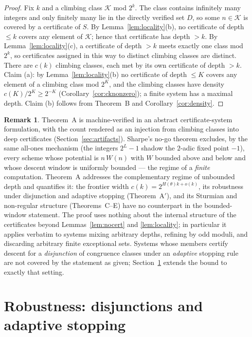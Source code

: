 \documentclass[11pt]{article}
\theoremstyle{definition}
\newtheorem{remark}[theorem]{Remark}
\begin{document}
\begin{proof}
Fix $k$ and a climbing class $\mathcal{K}$ mod $2^k$. The class contains
infinitely many integers and only finitely many lie in the directly
verified set $D$, so some $n\in\mathcal{K}$ is covered by a certificate of
$S$. By Lemma~\ref{lem:locality}(b), no certificate of depth $\le k$ covers
any element of $\mathcal{K}$; hence that certificate has depth $>k$. By
Lemma~\ref{lem:locality}(c), a certificate of depth $>k$ meets exactly one
class mod $2^k$, so certificates assigned in this way to distinct climbing
classes are distinct. There are $c(k)$ climbing classes, each met by its own certificate of
depth $>k$. Claim (a): by Lemma~\ref{lem:locality}(b) no certificate of
depth $\le K$ covers any element of a climbing class mod $2^K$, and the
climbing classes have density $c(K)/2^K\ge 2^{-K}$
(Corollary~\ref{cor:cknonzero}); a finite system has a maximal depth.
Claim (b) follows from Theorem~B and Corollary~\ref{cor:density}.
\end{proof}

\begin{remark}\label{rem:thmA}
Theorem~A is machine-verified in an abstract certificate-system
formulation, with the count rendered as an injection from climbing
classes into deep certificates (Section~\ref{sec:artifacts}).
Sharpe's no-go theorem \cite{Sharpe2026} excludes, by the same all-ones
mechanism (the integers $2^L-1$ shadow the $2$-adic fixed point $-1$),
every scheme whose potential is $n\,W(n)$ with $W$ bounded above and
below and whose descent window is uniformly bounded --- the regime of a
\emph{finite} computation. Theorem~A addresses the complementary regime
of unbounded depth and quantifies it: the frontier width
$c(k)=2^{H(\theta)k+o(k)}$, its robustness under disjunction and adaptive
stopping (Theorem~A$'$), and its Sturmian and non-regular structure
(Theorems~C--E) have no counterpart in the bounded-window statement.
The proof uses nothing about the internal structure of the certificates
beyond Lemmas~\ref{lem:nocert} and \ref{lem:locality}; in particular it
applies verbatim to systems mixing arbitrary depths, refining by odd
moduli, and discarding arbitrary finite exceptional sets. Systems whose
members certify descent for a \emph{disjunction} of congruence classes
under an \emph{adaptive} stopping rule are not covered by the statement as
given; Section~\ref{sec:adaptive} extends the bound to exactly that
setting.
\end{remark}

\section{Robustness: disjunctions and adaptive stopping}\label{sec:adaptive}
\end{document}

